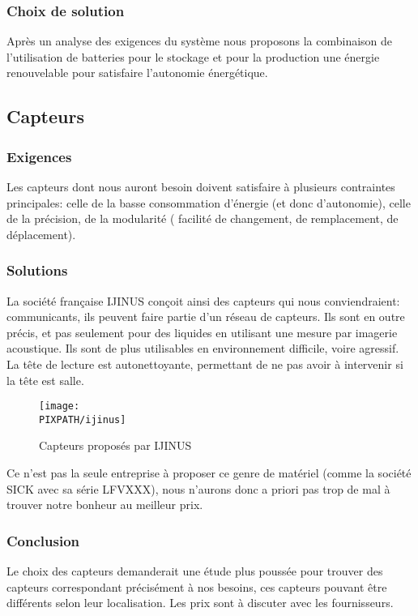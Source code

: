 \subsubsection{Choix de solution}
Après un analyse des exigences du système nous proposons la combinaison de l'utilisation de batteries pour le stockage et pour la production une énergie renouvelable pour satisfaire l'autonomie énergétique.

\subsection{Capteurs}

    \subsubsection{Exigences}
    Les capteurs dont nous auront besoin doivent satisfaire à plusieurs
    contraintes principales: celle de la basse consommation d'énergie
    (et donc d'autonomie), celle de la précision, de la modularité (
    facilité de changement, de remplacement, de déplacement).

    \subsubsection{Solutions}
    La société française IJINUS conçoit ainsi des capteurs qui nous
    conviendraient: communicants, ils peuvent faire partie d'un
    réseau de capteurs. Ils sont en outre précis, et pas seulement
    pour des liquides en utilisant une mesure par imagerie acoustique.
    Ils sont de plus utilisables en environnement difficile, voire agressif.
    La tête de lecture est autonettoyante, permettant de ne pas avoir
    à intervenir si la tête est salle.

    \begin{figure}[!h]
    \begin{center}
    \texttt{[image: \\PIXPATH/ijinus]}
    \caption{Capteurs proposés par IJINUS}
    \end{center}
    \end{figure}

    Ce n'est pas la seule entreprise à proposer ce genre de matériel (comme la société SICK avec sa série LFVXXX), nous
    n'aurons donc a priori pas trop de mal à trouver notre bonheur au meilleur
    prix.

    \subsubsection{Conclusion}
    Le choix des capteurs demanderait une étude plus poussée
    pour trouver des capteurs correspondant précisément à nos besoins,
    ces capteurs pouvant être différents selon leur localisation.
    Les prix sont à discuter avec les fournisseurs.

